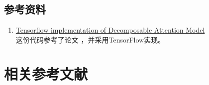 \subsection{参考资料}

\begin{enumerate}
    \item \href{https://github.com/siarez/sentence_pair_classifier}{Tensorflow implementation of Decomposable Attention Model} \\
        这份代码参考了论文 \cite{parikh2016decomposable}，并采用TensorFlow实现。

\end{enumerate}


\section{相关参考文献}

\ifx\projectsnotes\undefined
    
\fi
